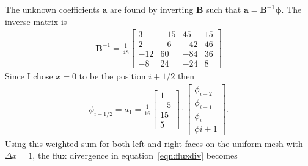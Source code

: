 \documentclass{article}
\begin{document}
The unknown coefficients $\mathbf{a}$ are found by inverting $\mathbf{B}$ such that $\mathbf{a} = \mathbf{B}^{-1} \bm{\phi}$.  The inverse matrix is
\begin{align}
	\mathbf{B}^{-1} = 
	\frac{1}{48}
	\begin{bmatrix}
		3 & -15 & 45 & 15 \\
		2 & -6 & -42 & 46 \\
		-12 & 60 & -84 & 36 \\
		-8 & 24 & -24 & 8
	\end{bmatrix}
\end{align}
Since I chose $x=0$ to be the position $i+1/2$ then 
\begin{align}
	\phi_{i+1/2} = a_1 = 
	\frac{1}{16}
	\begin{bmatrix}
		1 \\ -5 \\ 15 \\ 5
	\end{bmatrix}
	\cdot
	\begin{bmatrix}
		\phi_{i-2} \\
		\phi_{i-1} \\
		\phi_i \\
		\phi{i+1}
	\end{bmatrix} \text{.}
\end{align}
Using this weighted sum for both left and right faces on the uniform mesh with $\Delta x = 1$, the flux divergence in equation~\eqref{eqn:fluxdiv} becomes
\end{document}
